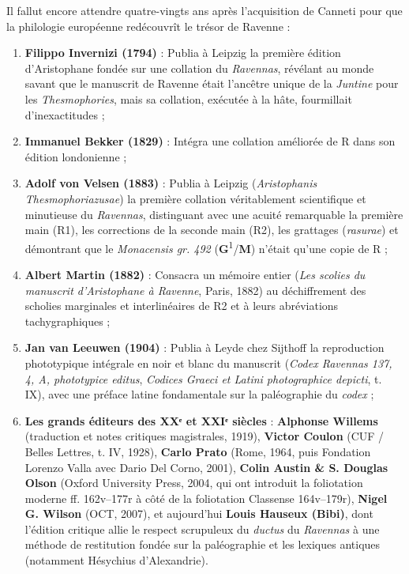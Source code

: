 \documentclass[11pt, a4paper, twoside]{article}
\renewcommand{\_}{\origunderscore\penalty0\relax}
\renewcommand{\texttt}[1]{#1}
\newcommand{\R}{\textbf{R}}
\newcommand{\Run}{\textbf{R}\textsuperscript{1}}
\newcommand{\Rdeux}{\textbf{R}\textsuperscript{2}}
\newcommand{\Gun}{\textbf{G}\textsuperscript{1}}
\newcommand{\M}{\textbf{M}}
\newcommand{\Bibi}{\textit{Bibi}}
\def\R{R}%
\def\Run{R1}%
\def\Rdeux{R2}%
\def\Bibi{Bibi}%
\begin{document}
Il fallut encore attendre quatre-vingts ans après l'acquisition de Canneti pour que la philologie européenne redécouvrît le trésor de Ravenne :
\begin{enumerate}[leftmargin=1.6em, itemsep=2pt]
  \item \textbf{Filippo Invernizi (1794)} : Publia à Leipzig la première édition d'Aristophane fondée sur une collation du \textit{Ravennas}, révélant au monde savant que le manuscrit de Ravenne était l'ancêtre unique de la \textit{Juntine} pour les \textit{Thesmophories}, mais sa collation, exécutée à la hâte, fourmillait d'inexactitudes ;
  \item \textbf{Immanuel Bekker (1829)} : Intégra une collation améliorée de \R{} dans son édition londonienne ;
  \item \textbf{Adolf von Velsen (1883)} : Publia à Leipzig (\textit{Aristophanis Thesmophoriazusae}) la première collation véritablement scientifique et minutieuse du \textit{Ravennas}, distinguant avec une acuité remarquable la première main (\Run{}), les corrections de la seconde main (\Rdeux{}), les grattages (\textit{rasurae}) et démontrant que le \textit{Monacensis gr. 492} (\Gun{}/\M{}) n'était qu'une copie de \R{} ;
  \item \textbf{Albert Martin (1882)} : Consacra un mémoire entier (\textit{Les scolies du manuscrit d'Aristophane à Ravenne}, Paris, 1882) au déchiffrement des scholies marginales et interlinéaires de \Rdeux{} et à leurs abréviations tachygraphiques ;
  \item \textbf{Jan van Leeuwen (1904)} : Publia à Leyde chez Sijthoff la reproduction phototypique intégrale en noir et blanc du manuscrit (\textit{Codex Ravennas 137, 4, A, phototypice editus}, \textit{Codices Graeci et Latini photographice depicti}, t. IX), avec une préface latine fondamentale sur la paléographie du \textit{codex} ;
  \item \textbf{Les grands éditeurs des XXᵉ et XXIᵉ siècles} : \textbf{Alphonse Willems} (traduction et notes critiques magistrales, 1919), \textbf{Victor Coulon} (CUF / Belles Lettres, t. IV, 1928), \textbf{Carlo Prato} (Rome, 1964, puis Fondation Lorenzo Valla avec Dario Del Corno, 2001), \textbf{Colin Austin \& S. Douglas Olson} (Oxford University Press, 2004, qui ont introduit la foliotation moderne \texttt{ff. 162v–177r} à côté de la foliotation Classense \texttt{164v–179r}), \textbf{Nigel G. Wilson} (OCT, 2007), et aujourd'hui \textbf{Louis Hauseux (\Bibi{})}, dont l'édition critique allie le respect scrupuleux du \textit{ductus} du \textit{Ravennas} à une méthode de restitution fondée sur la paléographie et les lexiques antiques (notamment Hésychius d'Alexandrie).
\end{enumerate}
\end{document}
